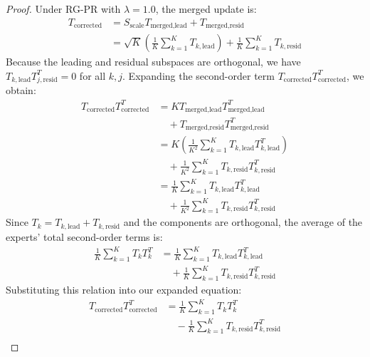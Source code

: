 \documentclass{article}
\theoremstyle{plain}
\theoremstyle{definition}
\theoremstyle{remark}
\begin{document}
\begin{proof}
Under RG-PR with $\lambda = 1.0$, the merged update is:
\begin{equation}
    \begin{aligned}
        T_{\text{corrected}} &= S_{\text{scale}} T_{\text{merged}, \text{lead}} + T_{\text{merged}, \text{resid}} \\
        &= \sqrt{K} \left( \frac{1}{K} \sum_{k=1}^K T_{k, \text{lead}} \right) + \frac{1}{K} \sum_{k=1}^K T_{k, \text{resid}}
    \end{aligned}
\end{equation}
Because the leading and residual subspaces are orthogonal, we have $T_{k, \text{lead}} T_{j, \text{resid}}^T = 0$ for all $k, j$. Expanding the second-order term $T_{\text{corrected}} T_{\text{corrected}}^T$, we obtain:
\begin{align*}
    T_{\text{corrected}} T_{\text{corrected}}^T &= K T_{\text{merged}, \text{lead}} T_{\text{merged}, \text{lead}}^T \\
    &\quad + T_{\text{merged}, \text{resid}} T_{\text{merged}, \text{resid}}^T \\
    &= K \left( \frac{1}{K^2} \sum_{k=1}^K T_{k, \text{lead}} T_{k, \text{lead}}^T \right) \\
    &\quad + \frac{1}{K^2} \sum_{k=1}^K T_{k, \text{resid}} T_{k, \text{resid}}^T \\
    &= \frac{1}{K} \sum_{k=1}^K T_{k, \text{lead}} T_{k, \text{lead}}^T \\
    &\quad + \frac{1}{K^2} \sum_{k=1}^K T_{k, \text{resid}} T_{k, \text{resid}}^T
\end{align*}
Since $T_k = T_{k, \text{lead}} + T_{k, \text{resid}}$ and the components are orthogonal, the average of the experts' total second-order terms is:
\begin{equation}
    \begin{aligned}
        \frac{1}{K} \sum_{k=1}^K T_k T_k^T &= \frac{1}{K} \sum_{k=1}^K T_{k, \text{lead}} T_{k, \text{lead}}^T \\
        &\quad + \frac{1}{K} \sum_{k=1}^K T_{k, \text{resid}} T_{k, \text{resid}}^T
    \end{aligned}
\end{equation}
Substituting this relation into our expanded equation:
\begin{align*}
    T_{\text{corrected}} T_{\text{corrected}}^T &= \frac{1}{K} \sum_{k=1}^K T_k T_k^T \\
    &\quad - \frac{1}{K} \sum_{k=1}^K T_{k, \text{resid}} T_{k, \text{resid}}^T \\

\end{align*}
\end{proof}
\end{document}
